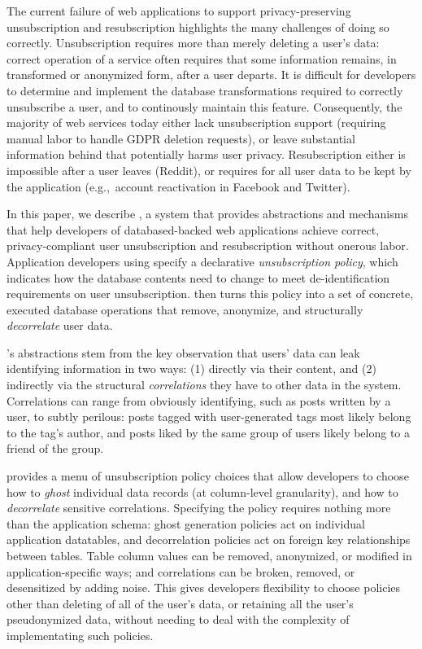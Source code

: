 The current failure of web applications to support privacy-preserving unsubscription and
resubscription  highlights the many challenges of doing so correctly.
%
Unsubscription requires more than merely deleting a user's data: correct operation of a service
often requires that some information remains, in transformed or anonymized form, after a user
departs.
%
%
It is difficult for developers to determine and implement the database transformations required to
correctly unsubscribe a user, and to continously maintain this feature.
%
Consequently, the majority of web services today either lack unsubscription support (requiring
manual labor to handle \eg GDPR deletion requests), or leave substantial information behind that
potentially harms user privacy.
%
Resubscription either is impossible after a user leaves (\eg Reddit), or requires for all user data
to be kept by the application (e.g.,\ account reactivation in Facebook and Twitter).

In this paper, we describe \sys, a system that provides abstractions and mechanisms
that help developers of databased-backed web applications achieve correct,
privacy-compliant user unsubscription and resubscription without onerous labor.
%
Application developers using \sys specify a declarative \emph{unsubscription policy},
which indicates how the database contents need to change to meet de-identification
requirements on user unsubscription.
%
\sys then turns this policy into a set of concrete, executed database operations that remove,
anonymize, and structurally \emph{decorrelate} user data.

\sys's abstractions stem from the key observation that users' data can leak identifying information
in two ways: (1) directly via their content, and (2) indirectly via the structural
\emph{correlations} they have to other data in the system.  Correlations can range from obviously
identifying, such as posts written by a user, to subtly perilous: posts tagged with user-generated
tags most likely belong to the tag's author, and posts liked by the same group of users likely
belong to a friend of the group.

%
\sys provides a menu of unsubscription policy choices that allow developers to choose how to
\emph{ghost} individual data records (at column-level granularity), and how to \emph{decorrelate}
sensitive correlations. Specifying the policy requires nothing more than the application schema:
ghost generation policies act on individual application datatables, and decorrelation policies act
on foreign key relationships between tables.  Table column values can be removed, anonymized, or
modified in application-specific ways; and correlations can be broken, removed, or desensitized by
adding noise.  This gives developers flexibility to choose policies other than deleting of all of the user's data,
or retaining all the user's pseudonymized data, without needing to deal with the complexity of
implementating such policies.

